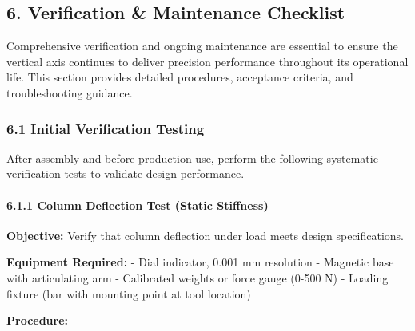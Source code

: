 \documentclass[
]{article}
\begin{document}
\subsection{6. Verification \& Maintenance
Checklist}\label{verification-maintenance-checklist}

Comprehensive verification and ongoing maintenance are essential to
ensure the vertical axis continues to deliver precision performance
throughout its operational life. This section provides detailed
procedures, acceptance criteria, and troubleshooting guidance.

\subsubsection{6.1 Initial Verification
Testing}\label{initial-verification-testing}

After assembly and before production use, perform the following
systematic verification tests to validate design performance.

\paragraph{6.1.1 Column Deflection Test (Static
Stiffness)}\label{column-deflection-test-static-stiffness}

\textbf{Objective:} Verify that column deflection under load meets
design specifications.

\textbf{Equipment Required:} - Dial indicator, 0.001 mm resolution -
Magnetic base with articulating arm - Calibrated weights or force gauge
(0-500 N) - Loading fixture (bar with mounting point at tool location)

\textbf{Procedure:}
\end{document}
